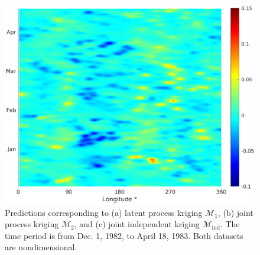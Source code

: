 \documentclass[article,ij4uq]{ij4uq}              %
\begin{document}
\begin{figure}[!t]
{\begin{minipage}[t]{0.3\textwidth}
  \centering
  \includegraphics[width=1\textwidth]{images/M4_rec_5.eps}
  \end{minipage}}
  \caption{Predictions corresponding to (a) latent process kriging $\mathcal{M}_{1}$, (b) joint process kriging $\mathcal{M}_{2}$, and (c) joint independent kriging $\mathcal{M}_{\mathrm{ind}}$. The time period is from Dec. 1, 1982, to April 18, 1983. Both datasets are nondimensional.}\label{fig:5}
\end{figure}
\end{document}
